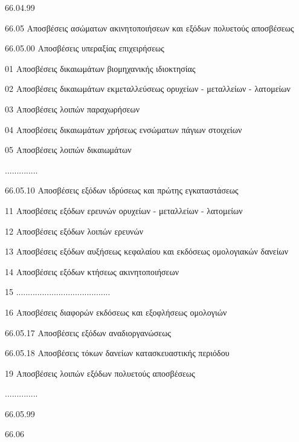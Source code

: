 \documentclass[A4,10pt,greek]{book}
\begin{document}
                     66.04.99

        66.05    Αποσβέσεις ασώματων ακινητοποιήσεων και εξόδων
                      πολυετούς αποσβέσεως

                     66.05.00    Αποσβέσεις υπεραξίας επιχειρήσεως

                               01    Αποσβέσεις δικαιωμάτων βιομηχανικής ιδιοκτησίας

                               02    Αποσβέσεις δικαιωμάτων εκμεταλλεύσεως ορυχείων -
                                       μεταλλείων - λατομείων

                               03    Αποσβέσεις λοιπών παραχωρήσεων

                               04    Αποσβέσεις δικαιωμάτων χρήσεως ενσώματων πάγιων
                                       στοιχείων

                               05    Αποσβέσεις λοιπών δικαιωμάτων

                     ..............

                     66.05.10    Αποσβέσεις εξόδων ιδρύσεως και πρώτης εγκαταστάσεως

                               11    Αποσβέσεις εξόδων ερευνών ορυχείων - μεταλλείων -
                                       λατομείων

                               12    Αποσβέσεις εξόδων λοιπών ερευνών

                               13    Αποσβέσεις εξόδων αυξήσεως κεφαλαίου και εκδόσεως
                                       ομολογιακών δανείων

                               14    Αποσβέσεις εξόδων κτήσεως ακινητοποιήσεων

                               15    ........................................

                               16    Αποσβέσεις διαφορών εκδόσεως και εξοφλήσεως ομολογιών

                     66.05.17    Αποσβέσεις εξόδων αναδιοργανώσεως

                     66.05.18    Αποσβέσεις τόκων δανείων κατασκευαστικής περιόδου

                               19    Αποσβέσεις λοιπών εξόδων πολυετούς αποσβέσεως

                     ..............

                     66.05.99

        66.06
\end{document}
